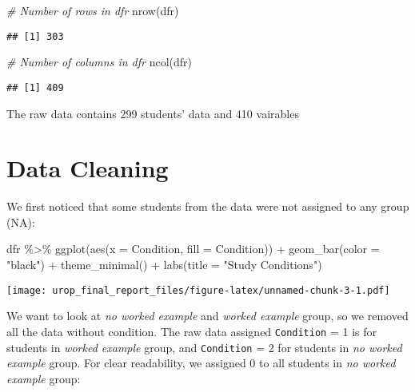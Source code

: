 \documentclass[
]{article}
\newenvironment{Shaded}{\begin{snugshade}}{\end{snugshade}}
\newcommand{\AttributeTok}[1]{\textcolor[rgb]{0.77,0.63,0.00}{#1}}
\newcommand{\CommentTok}[1]{\textcolor[rgb]{0.56,0.35,0.01}{\textit{#1}}}
\newcommand{\FunctionTok}[1]{\textcolor[rgb]{0.00,0.00,0.00}{#1}}
\newcommand{\NormalTok}[1]{#1}
\newcommand{\SpecialCharTok}[1]{\textcolor[rgb]{0.00,0.00,0.00}{#1}}
\newcommand{\StringTok}[1]{\textcolor[rgb]{0.31,0.60,0.02}{#1}}
\begin{document}
\begin{Shaded}
\begin{Highlighting}[]
\CommentTok{\# Number of rows in dfr}
\FunctionTok{nrow}\NormalTok{(dfr)}
\end{Highlighting}
\end{Shaded}

\begin{verbatim}
## [1] 303
\end{verbatim}

\begin{Shaded}
\begin{Highlighting}[]
\CommentTok{\# Number of columns in dfr}
\FunctionTok{ncol}\NormalTok{(dfr)}
\end{Highlighting}
\end{Shaded}

\begin{verbatim}
## [1] 409
\end{verbatim}

The raw data contains 299 students' data and 410 vairables

\hypertarget{data-cleaning}{%
\section{Data Cleaning}\label{data-cleaning}}

We first noticed that some students from the data were not assigned to
any group (NA):

\begin{Shaded}
\begin{Highlighting}[]
\NormalTok{dfr }\SpecialCharTok{\%\textgreater{}\%} \FunctionTok{ggplot}\NormalTok{(}\FunctionTok{aes}\NormalTok{(}\AttributeTok{x =}\NormalTok{ Condition, }\AttributeTok{fill =}\NormalTok{ Condition)) }\SpecialCharTok{+} 
  \FunctionTok{geom\_bar}\NormalTok{(}\AttributeTok{color =} \StringTok{"black"}\NormalTok{) }\SpecialCharTok{+} \FunctionTok{theme\_minimal}\NormalTok{() }\SpecialCharTok{+}
  \FunctionTok{labs}\NormalTok{(}\AttributeTok{title =} \StringTok{"Study Conditions"}\NormalTok{)}
\end{Highlighting}
\end{Shaded}

\texttt{[image: urop\_final\_report\_files/figure-latex/unnamed-chunk-3-1.pdf]}

We want to look at \emph{no worked example} and \emph{worked example}
group, so we removed all the data without condition. The raw data
assigned \texttt{Condition} = 1 is for students in \emph{worked example}
group, and \texttt{Condition} = 2 for students in \emph{no worked
example} group. For clear readability, we assigned 0 to all students in
\emph{no worked example} group:
\end{document}
